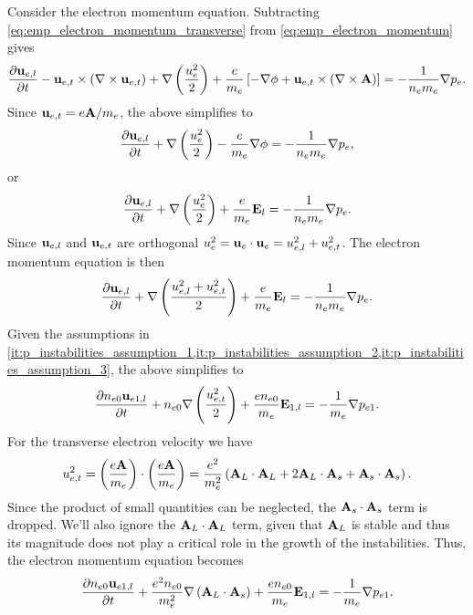 \documentclass[a4paper,11pt]{report}
\begin{document}
Consider the electron momentum equation. Subtracting \cref{eq:emp_electron_momentum_transverse} from \cref{eq:emp_electron_momentum} gives
\begin{equation}
    \label{eq:emp_electron_momentum_longitudinal}
    \frac{\partial\mathbf{u}_{e,l}}{\partial t} - \mathbf{u}_{e,t} \times \left ( \nabla \times \mathbf{u}_{e,t} \right ) + \nabla \left (\frac{u_e^2}{2} \right ) + \frac{e}{m_e} \left [ -\nabla \phi +\mathbf{u}_{e,t} \times \left ( \nabla \times \mathbf{A} \right ) \right ] = -\frac{1}{n_e m_e} \nabla p_e.
\end{equation}
Since $\mathbf{u}_{e,t} = e \mathbf{A} / m_e$, the above simplifies to
\begin{equation*}
    \frac{\partial\mathbf{u}_{e,l}}{\partial t} + \nabla \left (\frac{u_e^2}{2} \right ) - \frac{e}{m_e} \nabla \phi = -\frac{1}{n_e m_e} \nabla p_e,
\end{equation*}
or 
\begin{equation*}
    \frac{\partial\mathbf{u}_{e,l}}{\partial t} + \nabla \left (\frac{u_e^2}{2} \right ) + \frac{e}{m_e} \mathbf{E}_l = -\frac{1}{n_e m_e} \nabla p_e.
\end{equation*}
Since $\mathbf{u}_{e,l}$ and $\mathbf{u}_{e,t}$ are orthogonal $u_e^2 = \mathbf{u}_e \cdot \mathbf{u}_e = u_{e,l}^2 + u_{e,t}^2$. The electron momentum equation is then 
\begin{equation*}
    \frac{\partial\mathbf{u}_{e,l}}{\partial t} + \nabla \left (\frac{u_{e,l}^2 + u_{e,t}^2}{2} \right ) + \frac{e}{m_e} \mathbf{E}_l = -\frac{1}{n_e m_e} \nabla p_e.
\end{equation*}
Given the assumptions in \cref{it:p_instabilities_assumption_1,it:p_instabilities_assumption_2,it:p_instabilities_assumption_3}, the above simplifies to
\begin{equation*}
    \frac{\partial n_{e0} \mathbf{u}_{e1,l}}{\partial t} + n_{e0} \nabla \left (\frac{u_{e,t}^2}{2} \right ) + \frac{e n_{e0}}{m_e} \mathbf{E}_{1,l} = -\frac{1}{m_e} \nabla p_{e1} .
\end{equation*}
For the transverse electron velocity we have
\begin{equation*}
    u_{e,t}^2 = \left ( \frac{e \mathbf{A}}{m_e} \right ) \cdot \left ( \frac{e \mathbf{A}}{m_e} \right ) = \frac{e^2}{m_e^2} \left ( \mathbf{A}_L \cdot \mathbf{A}_ L + 2 \mathbf{A}_L \cdot \mathbf{A}_s + \mathbf{A}_s \cdot \mathbf{A}_s \right ).
\end{equation*}
Since the product of small quantities can be neglected, the $\mathbf{A}_s \cdot \mathbf{A}_s$ term is dropped. We'll also ignore the $\mathbf{A}_L \cdot \mathbf{A}_L$ term, given that $\mathbf{A}_L$ is stable and thus its magnitude does not play a critical role in the growth of the instabilities. Thus, the electron momentum equation becomes
\begin{equation}
    \label{eq:p_instabilities_e_mom_linearized}
    \frac{\partial n_{e0} \mathbf{u}_{e1,l}}{\partial t} + \frac{e^2 n_{e0}}{m_e^2} \nabla \left (\mathbf{A}_L \cdot \mathbf{A}_s \right ) + \frac{e n_{e0}}{m_e} \mathbf{E}_{1,l} = -\frac{1}{m_e} \nabla p_{e1}.
\end{equation}
\end{document}
